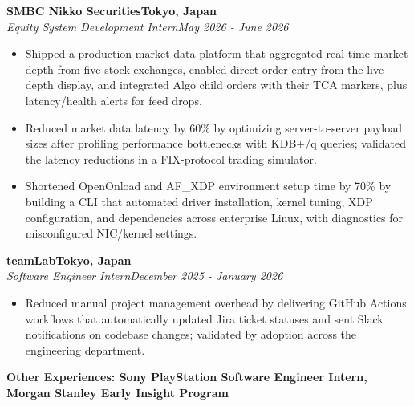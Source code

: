 \documentclass[10pt,letterpaper]{article}
\newcommand{\entry}[4]{%
  \textbf{#1}\hfill\textbf{#2}\\
  \textit{#3}\hfill\textit{#4}\par}
\begin{document}
\entry{SMBC Nikko Securities}{Tokyo, Japan}{Equity System Development Intern}{May 2026 - June 2026}
\begin{itemize}
  \item Shipped a production market data platform that aggregated real-time market depth from five stock exchanges, enabled direct order entry from the live depth display, and integrated Algo child orders with their TCA markers, plus latency/health alerts for feed drops.
  \item Reduced market data latency by 60\% by optimizing server-to-server payload sizes after profiling performance bottlenecks with KDB+/q queries; validated the latency reductions in a FIX-protocol trading simulator.
  \item Shortened OpenOnload and AF\_XDP environment setup time by 70\% by building a CLI that automated driver installation, kernel tuning, XDP configuration, and dependencies across enterprise Linux, with diagnostics for misconfigured NIC/kernel settings.
\end{itemize}

\entry{teamLab}{Tokyo, Japan}{Software Engineer Intern}{December 2025 - January 2026}
\begin{itemize}
  \item Reduced manual project management overhead by delivering GitHub Actions workflows that automatically updated Jira ticket statuses and sent Slack notifications on codebase changes; validated by adoption across the engineering department.
\end{itemize}
\textbf{Other Experiences: Sony PlayStation Software Engineer Intern, Morgan Stanley Early Insight Program}
\end{document}
